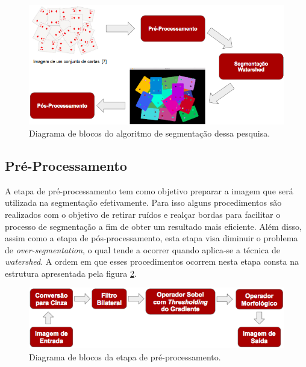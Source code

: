 	\begin{figure}[!htb]
       \begin{center}  
          \includegraphics[width=0.7\columnwidth]{img/diagrama_blocos_algoritmo.jpg}
           \caption{\label{fig:diagrama_blocos_algoritmo}Diagrama de blocos do algoritmo de segmentação dessa pesquisa.}
       \end{center}
   \end{figure} 

\subsection{Pré-Processamento}
A etapa de pré-processamento tem como objetivo preparar a imagem que será utilizada na segmentação efetivamente. Para isso alguns procedimentos são realizados com o objetivo de retirar ruídos e realçar bordas para facilitar o processo de segmentação a fim de obter um resultado mais eficiente. Além disso, assim como a etapa de pós-processamento, esta etapa visa diminuir o problema de \textit{over-segmentation}, o qual tende a ocorrer quando aplica-se a técnica de \textit{watershed}.
A ordem em que esses procedimentos ocorrem nesta etapa consta na estrutura apresentada pela figura \ref{fig:diagrama_blocos_preprocessamento}.

	\begin{figure}[!htb]
       \begin{center}  
          \includegraphics[width=0.8\columnwidth]{img/diagrama_blocos_preprocessamento.jpg}
           \caption{\label{fig:diagrama_blocos_preprocessamento}Diagrama de blocos da etapa de pré-processamento.}
       \end{center}
   \end{figure}
\clearpage   

